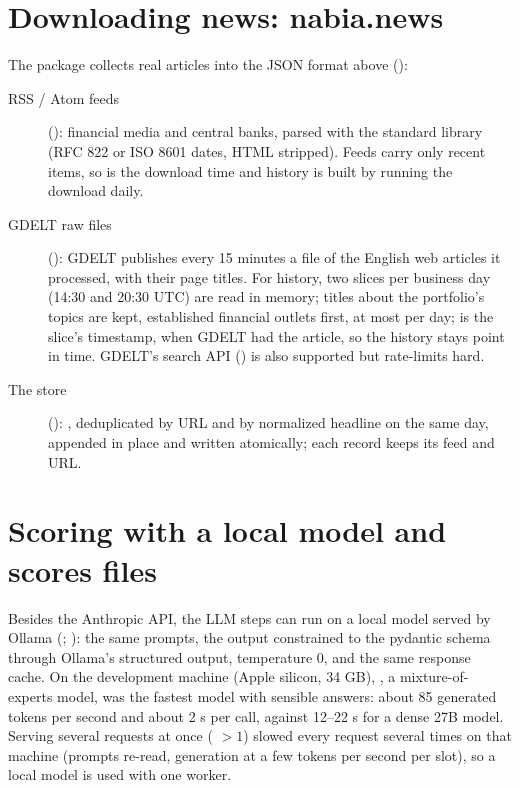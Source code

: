 \section{Downloading news: nabia.news}\label{sec:rb-news-download}
The package  collects real articles into the JSON format above ():
\begin{description}
  \item[RSS / Atom feeds] (): financial media and central banks, parsed with the standard library
        (RFC 822 or ISO 8601 dates, HTML stripped). Feeds carry only recent items, so  is the download
        time and history is built by running the download daily.
  \item[GDELT raw files] (): GDELT publishes every 15 minutes a file of the English web articles it
        processed, with their page titles. For history, two slices per business day (14:30 and 20:30 UTC) are read in
        memory; titles about the portfolio's topics are kept, established financial outlets first, at most
         per day;  is the slice's timestamp, when GDELT had the article, so the
        history stays point in time. GDELT's search API () is also supported but rate-limits hard.
  \item[The store] (): , deduplicated by URL and by normalized headline on the
        same day, appended in place and written atomically; each record keeps its feed and URL.
\end{description}

\section{Scoring with a local model and scores files}
Besides the Anthropic API, the LLM steps can run on a local model served by Ollama (;
): the same prompts, the output constrained to the pydantic schema through Ollama's structured
output, temperature 0, and the same response cache. On the development machine (Apple silicon, 34 GB),
, a mixture-of-experts model, was the fastest model with sensible answers: about 85 generated tokens
per second and about 2 s per call, against 12--22 s for a dense 27B model. Serving several requests at once
( $>1$) slowed every request several times on that machine (prompts re-read, generation
at a few tokens per second per slot), so a local model is used with one worker.

